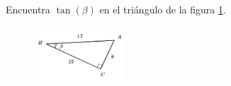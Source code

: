 \question[15] Encuentra $\tan(\beta)$ en el triángulo de la figura \ref{fig:functrig14}.
\begin{figure}[H]
    \begin{center}
        \includegraphics[width=0.3\textwidth]{../images/functrig14.png}
    \end{center}
    \caption{}
    \label{fig:functrig14}
\end{figure}
